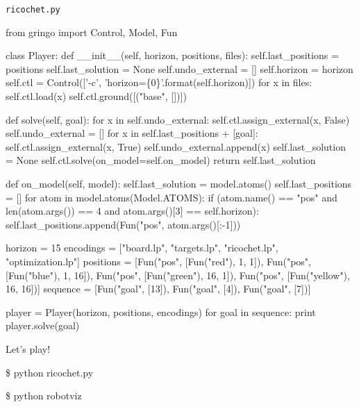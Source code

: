 \begin{frame}[fragile]{\texttt{ricochet.py}}
\Tiny\vspace{-15pt}
\begin{semiverbatim}
from gringo import Control, Model, Fun

class Player:
    def __init__(self, horizon, positions, files):
        self.last_positions = positions
        self.last_solution = None
        self.undo_external = []
        self.horizon = horizon
        self.ctl = Control(['-c', 'horizon=\{0\}'.format(self.horizon)])
        for x in files:
            self.ctl.load(x)
        self.ctl.ground([("base", [])])

    def solve(self, goal):
        for x in self.undo_external:
            self.ctl.assign_external(x, False)
        self.undo_external = []
        for x in self.last_positions + [goal]:
            self.ctl.assign_external(x, True)
            self.undo_external.append(x)
        self.last_solution = None
        self.ctl.solve(on_model=self.on_model)
        return self.last_solution

    def on_model(self, model):
        self.last_solution = model.atoms()
        self.last_positions = []
        for atom in model.atoms(Model.ATOMS):
            if (atom.name() == "pos" and len(atom.args()) == 4 and atom.args()[3] == self.horizon):
                self.last_positions.append(Fun("pos", atom.args()[:-1]))

horizon   = 15
encodings = ["board.lp", "targets.lp", "ricochet.lp", "optimization.lp"]
positions = [Fun("pos", [Fun("red"),     1,  1]), Fun("pos", [Fun("blue"),    1, 16]),
             Fun("pos", [Fun("green"),  16,  1]), Fun("pos", [Fun("yellow"), 16, 16])]
sequence  = [Fun("goal", [13]), Fun("goal", [4]), Fun("goal", [7])]

player = Player(horizon, positions, encodings)
for goal in sequence:
    print player.solve(goal)
\end{semiverbatim}
\end{frame}
\begin{frame}[fragile]{Let's play!}
\scriptsize
\begin{semiverbatim}
\$ python ricochet.py

\pause\$ python robotviz
\end{semiverbatim}
\end{frame}
